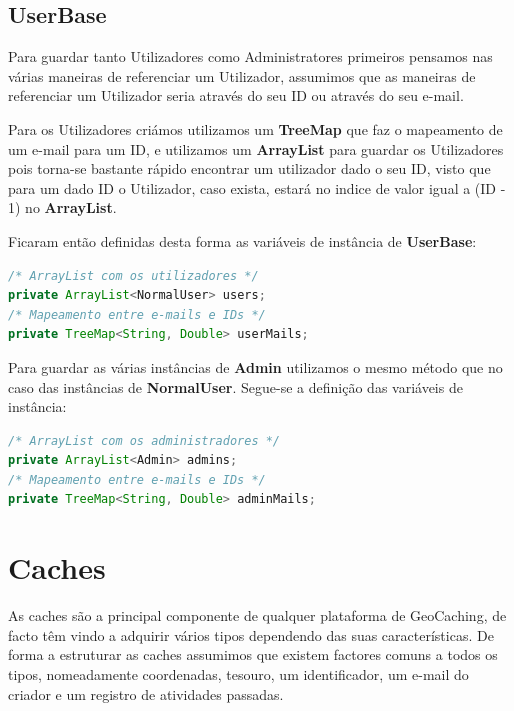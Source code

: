\documentclass{article}
\begin{document}
\subsection{UserBase}
\par Para guardar tanto Utilizadores como Administratores primeiros pensamos nas várias maneiras de referenciar um
Utilizador, assumimos que as maneiras de referenciar um Utilizador seria através do seu ID ou através do seu e-mail.
\par Para os Utilizadores criámos utilizamos um \textbf{TreeMap} que faz o mapeamento de um e-mail para um ID, e
utilizamos um \textbf{ArrayList} para guardar os Utilizadores pois torna-se bastante rápido encontrar um utilizador dado o
seu ID, visto que para um dado ID o Utilizador, caso exista, estará no indice de valor igual a (ID - 1) no \textbf{ArrayList}.
\par Ficaram então definidas desta forma as variáveis de instância de \textbf{UserBase}:
\begin{lstlisting}[language=Java]
/* ArrayList com os utilizadores */
private ArrayList<NormalUser> users;
/* Mapeamento entre e-mails e IDs */
private TreeMap<String, Double> userMails;
\end{lstlisting}

\par Para guardar as várias instâncias de \textbf{Admin} utilizamos o mesmo método que no caso das instâncias de
\textbf{NormalUser}. Segue-se a definição das variáveis de instância:
\begin{lstlisting}[language=Java]
/* ArrayList com os administradores */
private ArrayList<Admin> admins;
/* Mapeamento entre e-mails e IDs */
private TreeMap<String, Double> adminMails;
\end{lstlisting}













\pagebreak

\section{ Caches }
As caches são a principal componente de qualquer plataforma de GeoCaching, de facto têm vindo a adquirir vários tipos dependendo das suas características.
De forma a estruturar as caches assumimos que existem factores comuns a todos os tipos, nomeadamente coordenadas, tesouro, um identificador, um e-mail do criador e um registro de atividades passadas.
\end{document}
